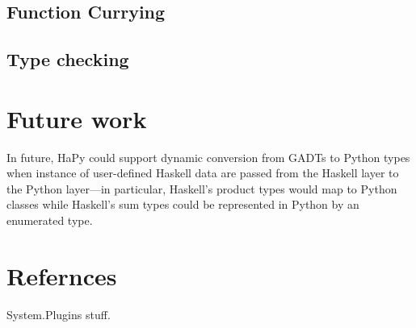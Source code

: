 \documentclass[11pt, letterpaper, oneside, twocolumn] {article}
\begin{document}
\subsection{Function Currying}

\subsection{Type checking}

\section{Future work}
In future, HaPy could support dynamic conversion from GADTs to Python types when instance of user-defined Haskell data are passed from the Haskell layer to the Python layer---in particular, Haskell's product types would map to Python classes while Haskell's sum types could be represented in Python by an enumerated type. 

\section{Refernces}
System.Plugins stuff.
\end{document}
